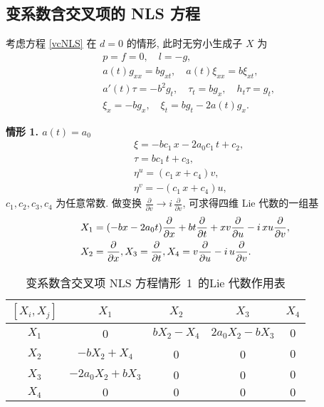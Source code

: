 \subsection{变系数含交叉项的 NLS 方程}
考虑方程 \eqref{vcNLS} 在 $d=0$ 的情形,
此时无穷小生成子 $X$ 为
\begin{align}
&p=f=0,\quad l=-g,\\
&a(t)g_{xx}=bg_{xt},\quad a(t)\xi_{xx}=b\xi_{xt},\\
&a'(t)\tau=-b^2g_t,\quad \tau_t=bg_x,\quad h_t \tau=g_t,\\
&\xi_x=-bg_x,\quad \xi_t=bg_t-2a(t)g_x.
\end{align}

\noindent \textbf{情形 1. $a(t)=a_0$}
\begin{align}
&\xi=-bc_1\,x-2a_0c_1\,t+c_2,\\
&\tau=bc_1\,t+c_3,\\
&\eta^u=(c_1\,x+c_4)v,\\
&\eta^v=-(c_1\,x+c_4)u,
\end{align}
$c_1,c_2,c_3,c_4$ 为任意常数.
做变换 $\frac{\partial}{\partial v}\rightarrow i\,\frac{\partial}{\partial v}$, 可求得四维 Lie 代数的一组基
\begin{align}\label{a0_X}
&X_1=(-bx-2a_0t)\frac{\partial}{\partial x}+bt\frac{\partial}{\partial t}+xv\frac{\partial}{\partial u}-i\,xu\frac{\partial}{\partial v},\notag\\
&X_2=\frac{\partial}{\partial x},
X_3=\frac{\partial}{\partial t},
X_4=v\frac{\partial}{\partial u}-i\,u\frac{\partial}{\partial v}.
\end{align}
\begin{table}\caption{变系数含交叉项 NLS 方程情形~1~的Lie 代数作用表}\label{T11}
\begin{center}
\begin{tabular}[Table 1]{|c|c|c|c|c|}
  \hline
  $[X_i,X_j]$ & $X_1$ & $X_2$ & $X_3$ & $X_4$\\
  \hline
  $X_1$ & 0 & $bX_2-X_4$ & $2a_0X_2-bX_3$ & $0$\\
  \hline
  $X_2$ & $-bX_2+X_4$ & 0 & 0 & $0$\\
  \hline
  $X_3$ & $-2a_0X_2+bX_3$ & 0 & 0 & $0$\\
  \hline
  $X_4$ & $0$ & $0$ & $0$ & $0$\\
  \hline
\end{tabular}
\end{center}
\end{table}

